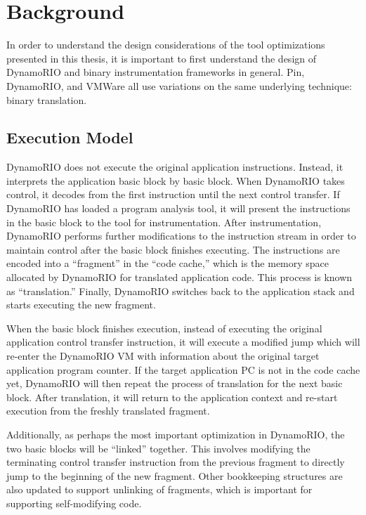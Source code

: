 \chapter{Background}


In order to understand the design considerations of the tool optimizations
presented in this thesis, it is important to first understand the design of
DynamoRIO and binary instrumentation frameworks in general.  Pin, DynamoRIO,
and VMWare all use variations on the same underlying technique: binary
translation.

\section{Execution Model}

DynamoRIO does not execute the original application instructions.  Instead, it
interprets the application basic block by basic block.  When DynamoRIO takes
control, it decodes from the first instruction until the next control transfer.
If DynamoRIO has loaded a program analysis tool, it will present the
instructions in the basic block to the tool for instrumentation.  After
instrumentation, DynamoRIO performs further modifications to the instruction
stream in order to maintain control after the basic block finishes executing.
The instructions are encoded into a ``fragment'' in the ``code cache,'' which
is the memory space allocated by DynamoRIO for translated application code.
This process is known as ``translation.''  Finally, DynamoRIO switches back to
the application stack and starts executing the new fragment.

When the basic block finishes execution, instead of executing the original
application control transfer instruction, it will execute a modified jump which
will re-enter the DynamoRIO VM with information about the original target
application program counter.  If the target application PC is not in the code
cache yet, DynamoRIO will then repeat the process of translation for the next
basic block.  After translation, it will return to the application context and
re-start execution from the freshly translated fragment.

Additionally, as perhaps the most important optimization in DynamoRIO, the two
basic blocks will be ``linked'' together.  This involves modifying the
terminating control transfer instruction from the previous fragment to directly
jump to the beginning of the new fragment.  Other bookkeeping structures are
also updated to support unlinking of fragments, which is important for
supporting self-modifying code.

